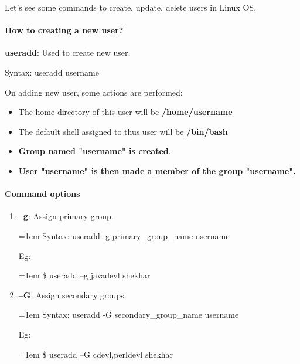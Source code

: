 \setlength{\columnsep}{3pt}
\begin{flushleft}
	
	Let's see some commands to create, update, delete users in Linux OS.
	
\paragraph{How to creating a new user?}
\bigskip
\textbf{useradd}: Used to create new user.
		\begin{tcolorbox}[breakable,notitle,boxrule=1pt,colback=pink,colframe=pink]
			\color{black}
			Syntax:  useradd username
		\end{tcolorbox}
		On adding new user, some actions are performed:	
		\begin{itemize}
			\item The home directory of this user will be \textbf{/home/username}
			\item The default shell assigned to thus user will be \textbf{/bin/bash}
			\item \textbf{Group named "username" is created}.
			\item \textbf{User "username" is then made a member of the group "username".}
		\end{itemize}

	\paragraph{Command options}
		\begin{enumerate}[label=(\alph*)]
			\item \textbf{–g}: Assign primary group.
			\bigskip
			\begin{tcolorbox}[breakable,notitle,boxrule=0pt,colback=pink,colframe=pink]
				\color{black}
				\font=1em
				Syntax: useradd -g primary\_group\_name username
				\font=4pt
			\end{tcolorbox}
			Eg:
			\bigskip
			\begin{tcolorbox}[breakable,notitle,boxrule=-0pt,colback=black,colframe=black]
				\color{green}
				\font=1em
				\$ useradd –g javadevl shekhar
				\font=4pt
			\end{tcolorbox}
			
			\item \textbf{–G}: Assign secondary groups.
			\bigskip
			\begin{tcolorbox}[breakable,notitle,boxrule=0pt,colback=pink,colframe=pink]
				\color{black}
				\font=1em
				Syntax: useradd -G secondary\_group\_name username
				\font=4pt
			\end{tcolorbox}
			Eg:
			\bigskip
			\begin{tcolorbox}[breakable,notitle,boxrule=-0pt,colback=black,colframe=black]
				\color{green}
				\font=1em
				\$ useradd –G cdevl,perldevl shekhar
				\font=4pt
			\end{tcolorbox}
			


\end{enumerate}
\end{flushleft}
